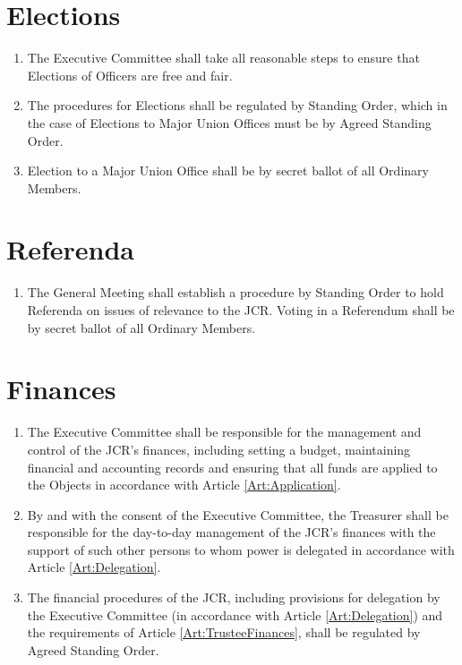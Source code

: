 \documentclass[11pt,a4paper, oneside]{memoir}
\begin{document}
	\section{Elections} \label{Art:Elections}
	\begin{enumerate}
		\item The Executive Committee shall take all reasonable steps to ensure that Elections of Officers are free and fair.
		\item The procedures for Elections shall be regulated by Standing Order, which in the case of Elections to Major Union Offices must be by Agreed Standing Order.
		\item Election to a Major Union Office shall be by secret ballot of all Ordinary Members.
	\end{enumerate}
	\section{Referenda} \label{Art:Referenda}
	\begin{enumerate}
		\item The General Meeting shall establish a procedure by Standing Order to hold Referenda on issues of relevance to the JCR.  Voting in a Referendum shall be by secret ballot of all Ordinary Members.
	\end{enumerate}
	\section{Finances} \label{Art:Finances}
	\begin{enumerate}
		\item The Executive Committee shall be responsible for the management and control of the JCR's finances, including setting a budget, maintaining financial and accounting records and ensuring that all funds are applied to the Objects in accordance with Article \ref{Art:Application}.
		\item By and with the consent of the Executive Committee, the Treasurer shall be responsible for the day-to-day management of the JCR's finances with the support of such other persons to whom power is delegated in accordance with Article \ref{Art:Delegation}.
		\item The financial procedures of the JCR, including provisions for delegation by the Executive Committee (in accordance with Article \ref{Art:Delegation}) and the requirements of Article \ref{Art:TrusteeFinances}, shall be regulated by Agreed Standing Order.
	\end{enumerate}
\end{document}
